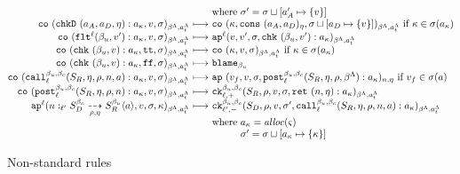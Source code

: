 \documentclass[preprint,onecolumn,9pt]{sigplanconf} %
\begin{document}
\begin{figure*}
\begin{gather*}
\begin{array}{@{}r@{\ }c@{\ }l@{}}
      &&\text{where } \msto' = \ext{\msto}{\maddr'_A}{\setof{\mval}}
      \\
      \co{\spush{\kchkD{\maddr_A, \maddr_D, \mtimeline}}{\mkaddr}, \mval, \msto}
         {\msmlab}{\mstimeline}
       &\machstep&
      \co{\mkont, \vconst{\maddr_A}{\maddr_D}{\mtimeline}, \ext{\msto}{\maddr_D}{\setof{\mval}}}
         {\msmlab}{\mstimeline}
        \text{ if } \mkont \in \msto(\mkaddr)
      \\
      \co{\spush{\kflat[^\mlab]{\mmlab_u, \mval'}}{\mkaddr}, \mval, \msto}{\msmlab}{\mstimeline} &\machstep&
      \ap[^\mlab]{\mval, \mval', \msto, \spush{\kcheck{\mmlab_u, \mval'}}{\mkaddr}}{\msmlab}{\mstimeline}
      \\
      \co{\spush{\kcheck{\mmlab_u, \mval}}{\mkaddr}, \strue, \msto}{\msmlab}{\mstimeline} &\machstep&
      \co{\mkont, \mval, \msto}{\msmlab}{\mstimeline} \text{ if } \mkont \in \msto(\mkaddr)
      \\
      \co{\spush{\kcheck{\mmlab_u, \mval}}{\mkaddr}, \sfalse, \msto}{\msmlab}{\mstimeline} &\machstep&
      \sblame{\mmlab_u}
      \\
      \co{\spush{\kmcall{\mmlab_u}{\mmlab_c}{\mlab}{\mscon_R, \mtimeline, \menv, \mname, \maddr}}{\mkaddr},
          \mval,
          \msto}{\msmlab}{\mstimeline} &\machstep&
      \ap{\mval_f,
          \mval,
          \msto,
          \spush{\kpost[^{\mmlab_u, \mmlab_c}_\mlab]{\mscon_R, \mtimeline, \menv, \msmlab}}{\mkaddr}}
         {\mname}{\mtimeline}
        \text{ if } \mval_f \in \msto(\maddr)
      \\
      \co{\spush{\kpost[^{\mmlab_u, \mmlab_c}_\mlab]{\mscon_R, \mtimeline, \menv, \mname}}{\mkaddr}, \mval, \msto}
         {\msmlab}{\mstimeline}
       &\machstep&
      \ck{\mmlab_u}{\mmlab_c}{\mlab}{+}
         {\mscon_R, \menv, \mval, \msto, \spush{\krt{\mname, \mtimeline}}{\mkaddr}}
         {\msmlab}{\mstimeline}
      \\
      \ap[^\mlab]{\blclos{\mname}{\mmlab_u}{\mmlab_c}{\mlab'}{\mscon_D}{\mscon_R}{\menv}{\mtimeline}{\maddr},
                  \mval,
                  \msto,
                  \mkont}
                 {\msmlab}{\mstimeline} &\machstep&
      \ck{\mmlab_u}{\mmlab_c}{\mlab'}{-}
         {\mscon_D, \menv, \mval, \msto',
          \spush{\kmcall{\mmlab_u}{\mmlab_c}{\mlab}{\mscon_R, \mtimeline, \menv, \mname, \maddr}}{\mkaddr}}
         {\msmlab}{\mstimeline} \\
      &&\text{where } \mkaddr = \alloc(\mstate) \\
      &&\phantom{\text{where }} \msto' = \ext{\msto}{\mkaddr}{\setof{\mkont}}
    \end{array}
  \end{gather*}
  \caption{Non-standard rules}
\label{fig:concrete}
\end{figure*}
\balance

%


% 
\end{document}
